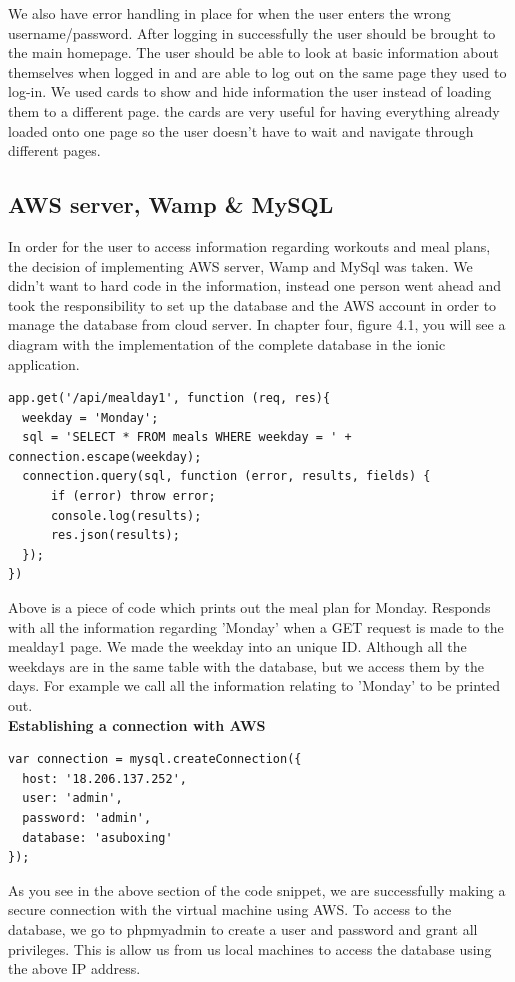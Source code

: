 \documentclass[a4paper,12pt]{report}
\begin{document}
We also have error handling in place for when the user enters the wrong username/password. After logging in successfully the user should be brought to the main homepage. The user should be able to look at basic information about themselves when logged in and are able to log out on the same page they used to log-in. We used cards to show and hide information the user instead of loading them to a different page. the cards are very useful for having everything already loaded onto one page so the user doesn't have to wait and navigate through different pages.
\newpage
\subsection{AWS server, Wamp \& MySQL}
In order for the user to access information regarding workouts and meal plans, the decision of implementing AWS server, Wamp and MySql was taken. We didn't want to hard code in the information, instead one person went ahead and took the responsibility to set up the database and the AWS account in order to manage the database from cloud server. In chapter four, figure 4.1, you will see a diagram with the implementation of the complete database in the ionic application.
\begin{verbatim}
app.get('/api/mealday1', function (req, res){
  weekday = 'Monday';
  sql = 'SELECT * FROM meals WHERE weekday = ' + connection.escape(weekday);
  connection.query(sql, function (error, results, fields) {
      if (error) throw error;
      console.log(results);
      res.json(results);
  });
})
\end{verbatim}
Above is a piece of code which prints out the meal plan for Monday.
Responds with all the information regarding 'Monday' when a GET request is made to the mealday1 page. We made the weekday into an unique ID. Although all the weekdays are in the same table with the database, but we access them by the days. For example we call all the information relating to 'Monday' to be printed out.
\\
\textbf{Establishing a connection with AWS}
\begin{verbatim}
var connection = mysql.createConnection({
  host: '18.206.137.252',
  user: 'admin',
  password: 'admin',
  database: 'asuboxing'
});
\end{verbatim}
As you see in the above section of the code snippet, we are successfully making a secure connection with the virtual machine using AWS. To access to the database, we go to phpmyadmin to create a user and password and grant all privileges. This is allow us from us local machines to access the database using the above IP address. 
\end{document}
